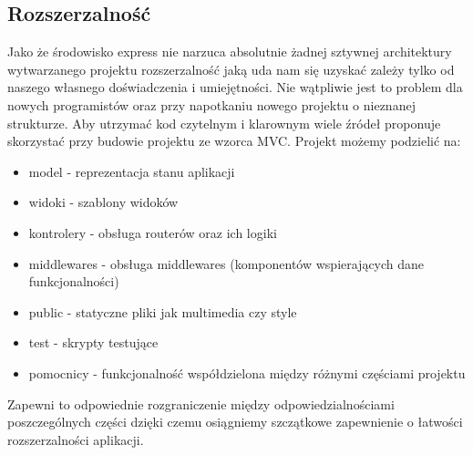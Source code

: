 \documentclass[12pt]{report}
\begin{document}
    \subsection{Rozszerzalność}
      Jako że środowisko express nie narzuca absolutnie żadnej sztywnej architektury wytwarzanego projektu rozszerzalność jaką uda nam się uzyskać zależy tylko od naszego własnego doświadczenia i umiejętności.
      Nie wątpliwie jest to problem dla nowych programistów oraz przy napotkaniu nowego projektu o nieznanej strukturze.
      Aby utrzymać kod czytelnym i klarownym wiele źródeł proponuje skorzystać przy budowie projektu ze wzorca MVC.
      Projekt możemy podzielić na:
      \begin{itemize}
        \item model - reprezentacja stanu aplikacji
        \item widoki - szablony widoków
        \item kontrolery - obsługa routerów oraz ich logiki
        \item middlewares - obsługa middlewares (komponentów wspierających dane funkcjonalności)
        \item public - statyczne pliki jak multimedia czy style
        \item test - skrypty testujące
        \item pomocnicy - funkcjonalność współdzielona między różnymi częściami projektu
      \end{itemize}
      Zapewni to odpowiednie rozgraniczenie między odpowiedzialnościami poszczególnych części dzięki czemu osiągniemy szczątkowe zapewnienie o łatwości rozszerzalności aplikacji. 
      
\end{document}
